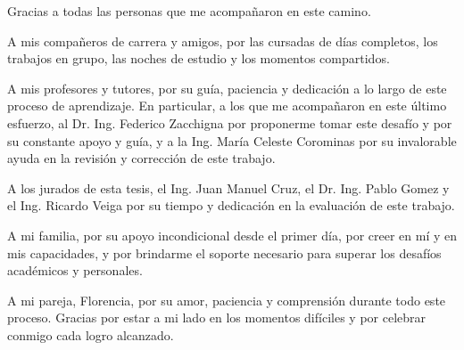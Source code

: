 \documentclass[
    11pt,
    spanish,
    singlespacing,
    parskip,
    headsepline,
    bookmarks=true,
    unicode=true,
    pdftoolbar=true,
    pdfmenubar=true,
    pdffitwindow=false,
    colorlinks=true,
    linkcolor=blue,
    citecolor=blue,
    urlcolor=blue
]{MastersDoctoralThesis}
\begin{document}
\begin{acknowledgements}
\vspace{1.5cm}
Gracias a todas las personas que me acompañaron en este camino.

A mis compañeros de carrera y amigos, por las cursadas de días completos, los trabajos en grupo, las noches de estudio y los momentos compartidos.

A mis profesores y tutores, por su guía, paciencia y dedicación a lo largo de este proceso de aprendizaje. En particular, a los que me acompañaron en este último esfuerzo, al Dr. Ing. Federico Zacchigna por proponerme tomar este desafío y por su constante apoyo y guía, y a la Ing. María Celeste Corominas por su invalorable ayuda en la revisión y corrección de este trabajo.

A los jurados de esta tesis, el Ing. Juan Manuel Cruz, el Dr. Ing. Pablo Gomez y el Ing. Ricardo Veiga por su tiempo y dedicación en la evaluación de este trabajo.

A mi familia, por su apoyo incondicional desde el primer día, por creer en mí y en mis capacidades, y por brindarme el soporte necesario para superar los desafíos académicos y personales.

A mi pareja, Florencia, por su amor, paciencia y comprensión durante todo este proceso. Gracias por estar a mi lado en los momentos difíciles y por celebrar conmigo cada logro alcanzado.

\end{acknowledgements}


\tableofcontents
\listoffigures
\listoftables




\mainmatter %
\pagestyle{thesis} %
\end{document}
